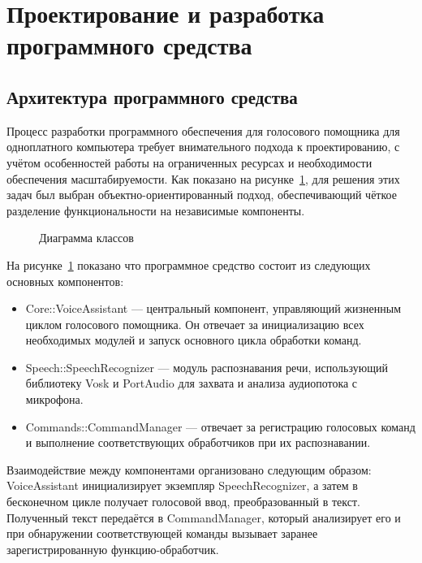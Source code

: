 \section{Проектирование и разработка программного средства}

\subsection{Архитектура программного средства}

Процесс разработки программного обеспечения для голосового помощника для одноплатного компьютера требует внимательного подхода к проектированию, с учётом особенностей работы на ограниченных ресурсах и необходимости обеспечения масштабируемости. Как показано на рисунке~\ref{fig:class_diagram}, для решения этих задач был выбран объектно-ориентированный подход, обеспечивающий чёткое разделение функциональности на независимые компоненты.

\begin{figure}[H]
	\centering
	\caption{Диаграмма классов}
	\label{fig:class_diagram}
\end{figure}
На рисунке~\ref{fig:class_diagram} показано что программное средство состоит из следующих основных компонентов:

\begin{itemize}
	\item {Core::VoiceAssistant} — центральный компонент, управляющий жизненным циклом голосового помощника. Он отвечает за инициализацию всех необходимых модулей и запуск основного цикла обработки команд.
	
	\item {Speech::SpeechRecognizer} — модуль распознавания речи, использующий библиотеку Vosk и PortAudio для захвата и анализа аудиопотока с микрофона.
	
	\item {Commands::CommandManager} — отвечает за регистрацию голосовых команд и выполнение соответствующих обработчиков при их распознавании.
\end{itemize}

Взаимодействие между компонентами организовано следующим образом: VoiceAssistant инициализирует экземпляр SpeechRecognizer, а затем в бесконечном цикле получает голосовой ввод, преобразованный в текст. Полученный текст передаётся в CommandManager, который анализирует его и при обнаружении соответствующей команды вызывает заранее зарегистрированную функцию-обработчик.

